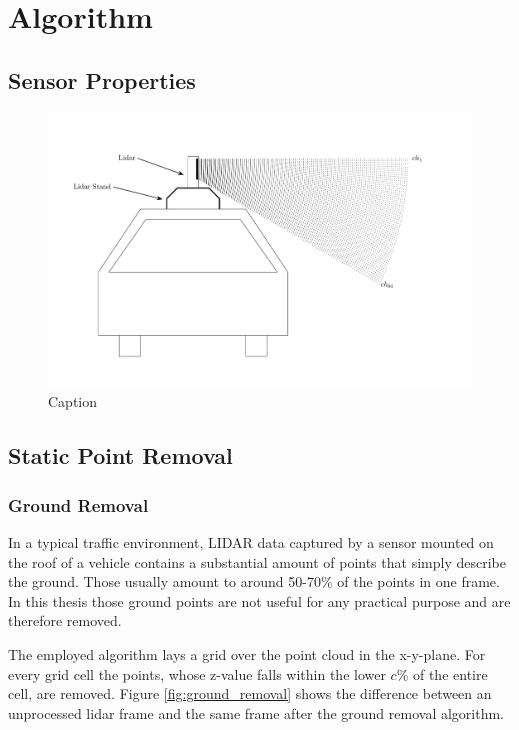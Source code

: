 \chapter{Algorithm}
\newpage


\section{Sensor Properties}

\begin{figure}
    \centering
    \includegraphics[width= \linewidth]{include/images/lidarImg.png}
    \caption{Caption}
    \label{fig:my_label}
\end{figure}

\section{Static Point Removal}

\subsection{Ground Removal}
In a typical traffic environment, LIDAR data captured by a sensor mounted on the roof of a vehicle contains a substantial amount of points that simply describe the ground. Those usually amount to around 50-70\% of the points in one frame. In this thesis those ground points are not useful for any practical purpose and are therefore removed.

The employed algorithm lays a grid over the point cloud in the x-y-plane. For every grid cell the points, whose z-value falls within the lower $c$\% of the entire cell, are removed. Figure \ref{fig:ground_removal} shows the difference between an unprocessed lidar frame and the same frame after the ground removal algorithm.

